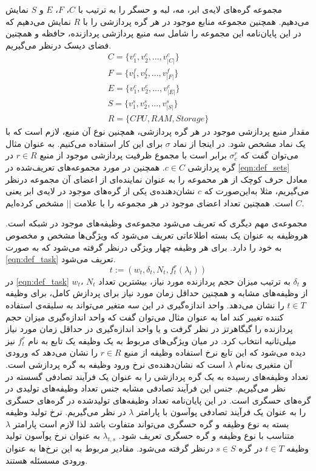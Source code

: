 	مجموعه‌ گره‌های لایه‌ی ابر، مه، لبه و حسگر را به ترتیب با $C$، $F$، $E$ و $S$ نمایش می‌دهیم. همچنین مجموعه منابع موجود در هر گره پردازشی را با $R$ نمایش می‌دهیم که در این پایان‌نامه این مجموعه را شامل سه منبع پردازشی پردازنده، حافظه و همچنین فضای دیسک درنظر می‌گیریم. 
    \begin{subequations}\label{eqn:def_sets}
    	\begin{align}
    	C = \{v_1^c, v_2^c, ..., v_{|C|}^c\} \\
    	F = \{v_1^f, v_2^f, ..., v_{|F|}^f\} \\
    	E = \{v_1^e, v_2^e, ..., v_{|E|}^e\} \\
    	S = \{v_1^s, v_2^s, ..., v_{|S|}^s\} \\
    	R = \{CPU, RAM, Storage\}
    	\end{align}
    \end{subequations}
	مقدار منبع پردازشی موجود در هر گره پردازشی، همچنین نوع آن منبع، لازم است که با یک نماد مشخص شود. در اینجا از نماد $\sigma$ برای این کار استفاده می‌کنیم. به عنوان مثال می‌توان گفت که $\sigma_c^r$ برابر است با مجموع ظرفیت پردازشی موجود از منبع $r \in R$ در گره پردازشی $c \in C$. 
    همچنین در مورد مجموعه‌های تعریف‌‌شده در \cref{eqn:def_sets} معادل حرف کوچک از هر محموعه را به عنوان نماینده‌ای از اعضای آن مجموعه درنظر می‌گیریم، مثلا به‌این‌صورت که $c$ نشان‌دهنده‌ی یکی از گره‌های موجود در لایه‌ی ابر یعنی $C$ است. همچنین تعداد اعضای موجود در هر مجموعه را با علامت $||$ مشخص کرده‌ایم. 
    
    مجموعه‌ی مهم دیگری که تعریف می‌شود مجموعه‌ی وظیفه‌های موجود در شبکه است.
    هروظیفه به عنوان یک بسته اطلاعاتی تعریف می‌شود که ویژگی‌ها مشخص و مخصوص به خود را دارد. برای هر وظیفه چهار ویژگی درنظر گرفته می‌شود که به صورت \cref{eqn:def_task} تعریف می‌شود. 
	\begin{equation}\label{eqn:def_task}
		t := (w_t, \delta_t, N_t, f_t^r(\lambda_t))
	\end{equation}
	در \cref{eqn:def_task} $w_t$، $N_t$ و $\delta_t$ به ترتیب میزان حجم پردازنده مورد نیاز، بیشترین تعداد از وظیفه‌های مشابه و همچنین حداقل زمان مورد نیاز برای پردازش کامل، برای وظیفه $t \in T$ را نشان می‌دهد. واحد اندازه‌گیری در این سه متغیر می‌تواند به سلیقه‌ی استفاده کننده تغییر کند اما به عنوان مثال می‌توان گفت که واحد اندازه‌گیری میزان حجم پردازنده را گیگاهرتز در نظر گرفت  و یا واحد اندازه‌گیری در حداقل زمان مورد نیاز میلی‌ثانیه انتخاب کرد. در میان ویژگی‌های مربوط به یک وظیفه یک تابع به نام $f_t^r$ نیز دیده می‌شود که این تابع نرخ استفاده وظیفه از منبع $r \in R$ را نشان می‌دهد که ورودی آن متغیری به‌نام $\lambda$ است که نشان‌دهنده‌ی نرخ ورود وظیفه به گره پردازشی است. تعداد وظیفه‌های رسیده به یک گره پردازشی را به عنوان یک فرآیند تصادفی گسسته در نظر می‌گیریم. جنس این فرآیند تصادفی مشابه جنس تعداد وظیفه‌های تولیدی در گره‌های حسگری است. در این پایان‌نامه تعداد وظیفه‌های تولیدشده در گره‌های حسگری را به عنوان یک فرآیند تصادفی پوآسون با پارامتر $\lambda$ در نظر می‌گیریم. 
	نرخ تولید وظیفه بسته به نوع وظیفه و گره حسگری می‌تواند متفاوت باشد لذا لازم است پارامتر $\lambda$ متناسب با نوع وظیفه و گره حسگری تعریف شود. $\lambda_{t,s}$ به عنوان نرخ پوآسون تولید وظیفه $t \in T$ در گره $s \in S$ درنظر گرفته می‌شود. مقادیر مربوط به این نرخ‌ها به عنوان ورودی مسسئله هستند.
	
